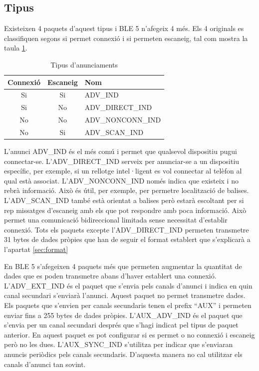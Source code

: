\subsection{Tipus}
Existeixen 4 paquets d'aquest tipus i BLE 5 n'afegeix 4 més.
Els 4 originals es classifiquen segons si permet connexió i si permeten escaneig, tal com mostra la taula \ref{tab:Advertisment_Types}.

\begin{table}[!h]
	\begin{center}
		\begin{tabular}{|c|c|l|}
			\hline
			Connexió	&	Escaneig	&	Nom	\\	\hline
			Si			&	Si			&	ADV\_IND	\\	\hline
			Si			&	No			&	ADV\_DIRECT\_IND	\\	\hline
			No			&	No			&	ADV\_NONCONN\_IND	\\	\hline
			No			&	Si			&	ADV\_SCAN\_IND	\\	\hline
		\end{tabular}
	\end{center}
\caption{Tipus d'anunciaments}
\label{tab:Advertisment_Types}
\end{table}


L'anunci ADV\_IND és el més comú i permet que qualsevol dispositiu pugui connectar-se.
L'ADV\_DIRECT\_IND serveix per anunciar-se a un dispositiu específic, per exemple, si un rellotge intel·ligent es vol connectar al telèfon al qual està associat.
L'ADV\_NONCONN\_IND només indica que existeix i no rebrà informació.
Això és útil, per exemple, per permetre localització de balises.
L'ADV\_SCAN\_IND també està orientat a balises però estarà escoltant per si rep missatges d'escaneig amb els que pot respondre amb poca informació.
Això permet una comunicació bidireccional limitada sense necessitat d'establir connexió.
Tots els paquets excepte l'ADV\_DIRECT\_IND permeten transmetre 31 bytes de dades pròpies que han de seguir el format establert que s'explicarà a l'apartat \ref{sec:format}

\label{Advertising_Extension_PDU}
En BLE 5 s'afegeixen 4 paquets més que permeten augmentar la quantitat de dades que es poden transmetre abans d'haver establert una connexió.
L'ADV\_EXT\_IND és el paquet que s'envia pels canals d'anunci i indica en quin canal secundari s'enviarà l'anunci. Aquest paquet no permet transmetre dades.
Els paquets que s'envien per canals secundaris tenen el prefix ``AUX'' i permeten enviar fins a 255 bytes de dades pròpies.
L'AUX\_ADV\_IND és el paquet que s'envia per un canal secundari després que s'hagi indicat pel tipus de paquet anterior.
En aquest paquet es pot configurar si es permet o no connexió i escaneig però no les dues.
L'AUX\_SYNC\_IND s'utilitza per indicar que s'enviaran anuncis periòdics pels canals secundaris.
D'aquesta manera no cal utilitzar els canals d'anunci tan sovint.

